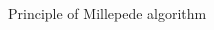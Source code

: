 \documentclass{ikpKoeln}
\begin{document}
\begin{frame}[t]{Principle of Millepede algorithm}
\begin{columns}[t]
\begin{column}{0.45 \textwidth}
		\end{column}
	\end{columns}
\end{frame}
\end{document}
